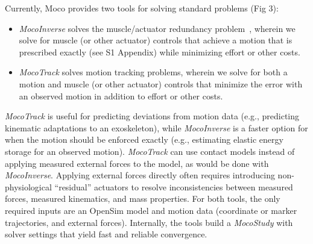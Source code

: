 \documentclass[10pt,letterpaper]{article}
\begin{document}
Currently, Moco provides two tools for solving standard problems (Fig 3):
\begin{itemize}
\item \textit{\textit{MocoInverse}} solves the muscle/actuator redundancy problem~\cite{Groote:2016dq}, wherein we solve for muscle (or other actuator) controls that achieve a motion that is prescribed exactly (see S1 Appendix) while minimizing effort or other costs.
\item \textit{\textit{MocoTrack}} solves motion tracking problems, wherein we solve for both a motion and muscle (or other actuator) controls that minimize the error with an observed motion in addition to effort or other costs.
\end{itemize}
\textit{MocoTrack} is useful for predicting deviations from motion data (e.g., predicting kinematic adaptations to an exoskeleton), while \textit{MocoInverse} is a faster option for when the motion should be enforced exactly (e.g., estimating elastic energy storage for an observed motion). \textit{MocoTrack} can use contact models instead of applying measured external forces to the model, as would be done with \textit{MocoInverse}. Applying external forces directly often requires introducing non-physiological “residual” actuators to resolve inconsistencies between measured forces, measured kinematics, and mass properties. For both tools, the only required inputs are an OpenSim model and motion data (coordinate or marker trajectories, and external forces). Internally, the tools build a \textit{MocoStudy} with solver settings that yield fast and reliable convergence.
\end{document}
